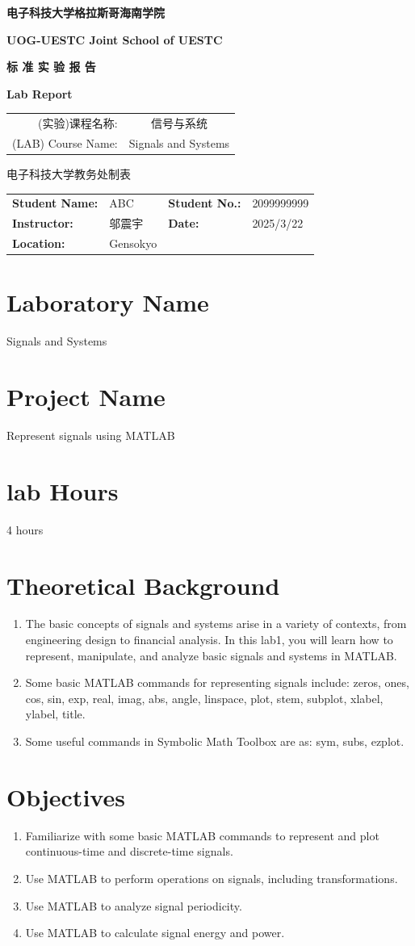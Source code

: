 \documentclass[12pt]{article}
\makeatletter
\renewcommand{\maketitle}{
    \begin{titlepage}
        \begin{center}
            \vspace*{0cm}
            
            {\huge \kaishu \textbf{电子科技大学格拉斯哥海南学院}}
            
            \vspace{0.5cm}
            {\Large \textbf{UOG-UESTC Joint School of UESTC}}
            
            \vspace{4cm}
            
            {\Huge \kaishu \textbf{标 准 实 验 报 告}}
            
            \vspace{0.5cm}
            {\Large \textbf{Lab Report}}
            
            \vspace{4cm}
            
            \begin{center}
            \begin{tabular}{rc}
                \kaishu (实验)课程名称: & \kaishu 信号与系统 \\[0.5cm]
                (LAB) Course Name: & Signals and Systems
            \end{tabular}
            \end{center}
            
            \vfill
            
            {\large \kaishu 电子科技大学教务处制表}
        \end{center}
    \end{titlepage}
    
    \noindent
    \begin{tabular}{ll@{\hspace{4cm}}ll}
        \textbf{Student Name:} & ABC & \textbf{Student No.:} & 2099999999 \\[0.5cm]
        \textbf{Instructor:} & 邬震宇 & \textbf{Date:} & 2025/3/22 \\[0.5cm]
        \textbf{Location:} & Gensokyo
    \end{tabular}
    
    \vspace{1cm}
}
\makeatother
\begin{document}
\maketitle

\section{Laboratory Name}
Signals and Systems

\section{Project Name}
Represent signals using MATLAB

\section{lab Hours}
4 hours

\section{Theoretical Background}
\begin{enumerate}[leftmargin=2em]
    \item The basic concepts of signals and systems arise in a variety of contexts, from engineering design to financial analysis. In this lab1, you will learn how to represent, manipulate, and analyze basic signals and systems in MATLAB.
    \item Some basic MATLAB commands for representing signals include: zeros, ones, cos, sin, exp, real, imag, abs, angle, linspace, plot, stem, subplot, xlabel, ylabel, title.
    \item Some useful commands in Symbolic Math Toolbox are as: sym, subs, ezplot.
\end{enumerate}


\section{Objectives}
\begin{enumerate}
    \item Familiarize with some basic MATLAB commands to represent and plot continuous-time and discrete-time signals.
    \item Use MATLAB to perform operations on signals, including transformations.
    \item Use MATLAB to analyze signal periodicity.
    \item Use MATLAB to calculate signal energy and power.
\end{enumerate}
\end{document}

